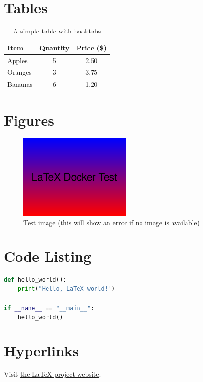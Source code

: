 \documentclass[12pt,a4paper]{article}
\begin{document}
    \section{Tables}
    \begin{table}[h]
        \centering
        \caption{A simple table with booktabs}
        \begin{tabular}{lcc}
            \toprule
            Item & Quantity & Price (\$) \\
            \midrule
            Apples & 5 & 2.50 \\
            Oranges & 3 & 3.75 \\
            Bananas & 6 & 1.20 \\
            \bottomrule
        \end{tabular}
    \end{table}

    \section{Figures}
    \begin{figure}[h]
        \centering
        \includegraphics[width=0.5\textwidth]{test-image.png}
        \caption{Test image (this will show an error if no image is available)}
    \end{figure}

    \section{Code Listing}
    \begin{lstlisting}[language=Python, caption=Sample Python code]
def hello_world():
    print("Hello, LaTeX world!")

if __name__ == "__main__":
    hello_world()
    \end{lstlisting}

    \section{Hyperlinks}
    Visit \href{https://www.latex-project.org/}{the \LaTeX{} project website}.
\end{document}
